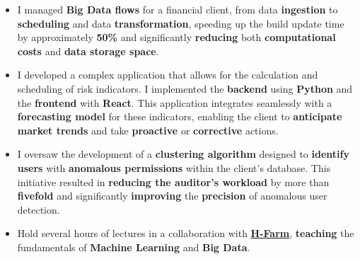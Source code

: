 \documentclass[10pt,a4paper]{altacv}
\begin{document}




    \begin{itemize}
        \item I managed \textbf{Big Data flows} for a financial client, from data \textbf{ingestion} to \textbf{scheduling} and data                                   \textbf{transformation}, speeding up the build update time by approximately \textbf{50\% }and significantly \textbf{reducing}                both \textbf{computational costs} and \textbf{data storage space}.
    \end{itemize}
    \begin{itemize}
        \item I developed a complex application that allows for the calculation and scheduling of risk indicators. I implemented the \textbf{backend} using \textbf{Python} and the \textbf{frontend} with \textbf{React}. This application integrates seamlessly with a \textbf{forecasting model} for these indicators, enabling the client to \textbf{anticipate market trends} and take \textbf{proactive} or \textbf{corrective} actions.
    \end{itemize}
    
    \begin{itemize}
        \item I oversaw the development of a \textbf{clustering algorithm} designed to \textbf{identify users} with \textbf{anomalous permissions} within the client's database. This initiative resulted in \textbf{reducing the auditor's workload} by more than \textbf{fivefold} and significantly \textbf{improving} the \textbf{precision} of anomalous user detection.
        \item Hold several hours of lectures in a collaboration with \textbf{\href{https://www.h-farm.com/it/education/college/master-universitari}{H-Farm}}, \textbf{teaching} the fundamentals of \textbf{Machine Learning} and \textbf{Big Data}.
    \end{itemize}
\end{document}
